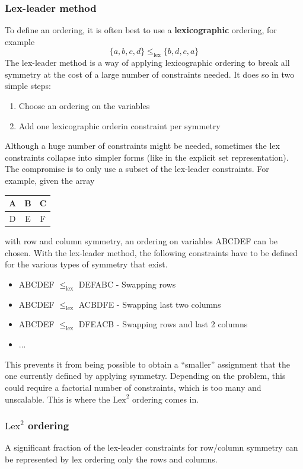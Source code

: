 \documentclass[CS4402-Notes.tex]{subfiles}
\begin{document}
\subsubsection{Lex-leader method}
To define an ordering, it is often best to use a \textbf{lexicographic} ordering, for example
\begin{equation}
\{a, b, c, d\} \leq_{\text{lex}} \{b, d, c, a\}
\end{equation}
The lex-leader method is a way of applying lexicographic ordering to break all symmetry at the cost of a large number of constraints needed. It does so in two simple steps:
\begin{enumerate}
\item Choose an ordering on the variables
\item Add one lexicographic orderin constraint per symmetry
\end{enumerate}
Although a huge number of constraints might be needed, sometimes the lex constraints collapse into simpler forms (like in the explicit set representation). The compromise is to only use a subset of the lex-leader constraints. For example, given the array
\begin{table}[H]
\centering
\begin{tabular}{| c | c | c |}
  \hline
  A & B & C \\
  \hline
  D & E & F \\
  \hline
\end{tabular}
\end{table}
with row and column symmetry, an ordering on variables ABCDEF can be chosen. With the lex-leader method, the following constraints have to be defined for the various types of symmetry that exist.
\begin{itemize}
\item ABCDEF $\leq_{\text{lex}}$ DEFABC - Swapping rows
\item ABCDEF $\leq_{\text{lex}}$ ACBDFE - Swapping last two columns
\item ABCDEF $\leq_{\text{lex}}$ DFEACB - Swapping rows and last 2 columns
\item ...
\end{itemize}
This prevents it from being possible to obtain a ``smaller'' assignment that the one currently defined by applying symmetry. Depending on the problem, this could require a factorial number of constraints, which is too many and unscalable. This is where the $\text{Lex}^{2}$ ordering comes in.

\subsubsection{$\text{Lex}^{2}$ ordering}
A significant fraction of the lex-leader constraints for row/column symmetry can be represented by lex ordering only the rows and columns.
\end{document}
